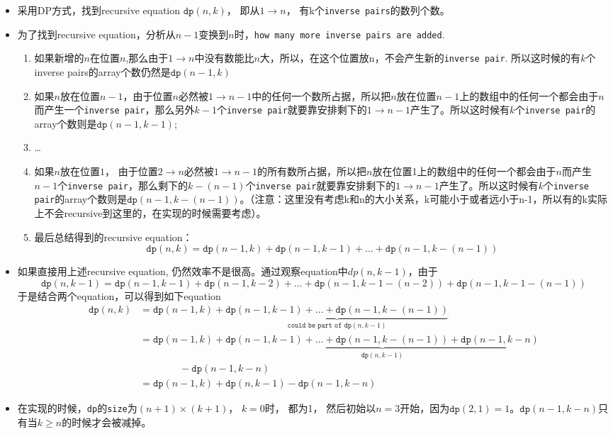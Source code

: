 \documentclass[a4paper,12pt]{article}
\begin{document}
\begin{CJK*}{UTF8}{gbsn}
	\begin{itemize}
		\item 采用DP方式，找到recursive equation $\mathtt{dp}(n, k)$， 即从$1\to n$， 有k个\texttt{inverse pairs}的数列个数。
		\item 为了找到recursive equation，分析从$n-1$变换到$n$时，\texttt{how many more inverse pairs are added}.
		\begin{enumerate}
			\item 如果新增的$n$在位置$n$,那么由于$1 \to n$中没有数能比$n$大，所以，在这个位置放n，不会产生新的\texttt{inverse pair}. 所以这时候的有$k$个inverse pairs的array个数仍然是$\mathtt{dp}(n-1, k)$
			\item 如果$n$放在位置$n-1$，由于位置$n$必然被$1 \to n-1$中的任何一个数所占据，所以把$n$放在位置$n-1$上的数组中的任何一个都会由于$n$而产生一个\texttt{inverse pair}，那么另外$k-1$个\texttt{inverse pair}就要靠安排剩下的$1\to n-1$产生了。所以这时候有$k$个\texttt{inverse pair}的array个数则是$\mathtt{dp}(n-1, k-1)$;
			\item \ldots
			\item 如果$n$放在位置$1$， 由于位置$2 \to n$必然被$1 \to n-1$的所有数所占据，所以把$n$放在位置1上的数组中的任何一个都会由于$n$而产生$n-1$个\texttt{inverse pair}，那么剩下的$k-(n-1)$个\texttt{inverse pair}就要靠安排剩下的$1\to n-1$产生了。所以这时候有$k$个\texttt{inverse pair}的array个数则是$\mathtt{dp}(n-1, k-(n-1))$。（注意：这里没有考虑k和n的大小关系，k可能小于或者远小于n-1，所以有的k实际上不会recursive到这里的，在实现的时候需要考虑）。
			\item 最后总结得到的recursive equation：
			$$
			\mathtt{dp}(n, k) = \mathtt{dp}(n-1, k) + \mathtt{dp}(n-1, k-1) + \ldots + \mathtt{dp}(n-1, k-(n-1))
			$$
		\end{enumerate}
	\item 如果直接用上述recursive equation, 仍然效率不是很高。通过观察equation中$dp(n, k-1)$，由于
	$$
	\mathtt{dp}(n, k-1) = \mathtt{dp}(n-1, k-1) + \mathtt{dp}(n-1, k-2) + \ldots + \mathtt{dp}(n-1, k-1-(n-2)) + \mathtt{dp}(n-1, k-1-(n-1))
	$$
	于是结合两个equation，可以得到如下equation
	\begin{equation}
	\begin{split}
	\mathtt{dp}(n, k) &= \mathtt{dp}(n-1, k) + \underbrace{\mathtt{dp}(n-1, k-1) + \ldots + \mathtt{dp}(n-1, k-(n-1))}_{\texttt{could be part of }\mathtt{dp}(n, k-1)} \\
	&= \mathtt{dp}(n-1, k) + \underbrace{\mathtt{dp}(n-1, k-1) + \ldots + \mathtt{dp}(n-1, k-(n-1)) + \mathtt{dp}(n-1, k-n)}_{\mathtt{dp}(n, k-1)} \\
	&\qquad \qquad - \mathtt{dp}(n-1, k-n) \\
	&= \mathtt{dp}(n-1, k) + \mathtt{dp}(n, k-1) - \mathtt{dp}(n-1, k-n)
	\end{split}
	\end{equation}
	\item 在实现的时候，\texttt{dp}的\texttt{size}为$(n+1)\times(k+1)$， $k=0$时， 都为1， 然后初始以$n=3$开始，因为$\mathtt{dp}(2,1)=1$。$\mathtt{dp}(n-1, k-n)$只有当$k \geq n$的时候才会被减掉。
	\end{itemize}
	\clearpage
\end{CJK*}
\end{document}

